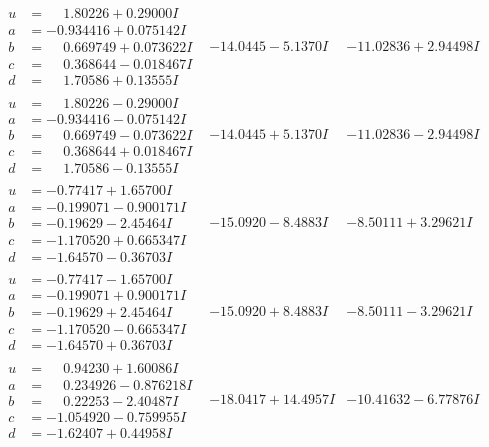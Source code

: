 \documentclass[1p]{elsarticle_modified}
\theoremstyle{definition}
\begin{document}
$$\begin{array}{c|c|c}
\begin{aligned}
u &= \phantom{-}1.80226 + 0.29000 I \\
a &= -0.934416 + 0.075142 I \\
b &= \phantom{-}0.669749 + 0.073622 I \\
c &= \phantom{-}0.368644 - 0.018467 I \\
d &= \phantom{-}1.70586 + 0.13555 I\end{aligned}
 & -14.0445 - 5.1370 I & -11.02836 + 2.94498 I \\ \hline\begin{aligned}
u &= \phantom{-}1.80226 - 0.29000 I \\
a &= -0.934416 - 0.075142 I \\
b &= \phantom{-}0.669749 - 0.073622 I \\
c &= \phantom{-}0.368644 + 0.018467 I \\
d &= \phantom{-}1.70586 - 0.13555 I\end{aligned}
 & -14.0445 + 5.1370 I & -11.02836 - 2.94498 I \\ \hline\begin{aligned}
u &= -0.77417 + 1.65700 I \\
a &= -0.199071 - 0.900171 I \\
b &= -0.19629 - 2.45464 I \\
c &= -1.170520 + 0.665347 I \\
d &= -1.64570 - 0.36703 I\end{aligned}
 & -15.0920 - 8.4883 I & -8.50111 + 3.29621 I \\ \hline\begin{aligned}
u &= -0.77417 - 1.65700 I \\
a &= -0.199071 + 0.900171 I \\
b &= -0.19629 + 2.45464 I \\
c &= -1.170520 - 0.665347 I \\
d &= -1.64570 + 0.36703 I\end{aligned}
 & -15.0920 + 8.4883 I & -8.50111 - 3.29621 I \\ \hline\begin{aligned}
u &= \phantom{-}0.94230 + 1.60086 I \\
a &= \phantom{-}0.234926 - 0.876218 I \\
b &= \phantom{-}0.22253 - 2.40487 I \\
c &= -1.054920 - 0.759955 I \\
d &= -1.62407 + 0.44958 I\end{aligned}
 & -18.0417 + 14.4957 I & -10.41632 - 6.77876 I\\

\end{array}$$
\end{document}
